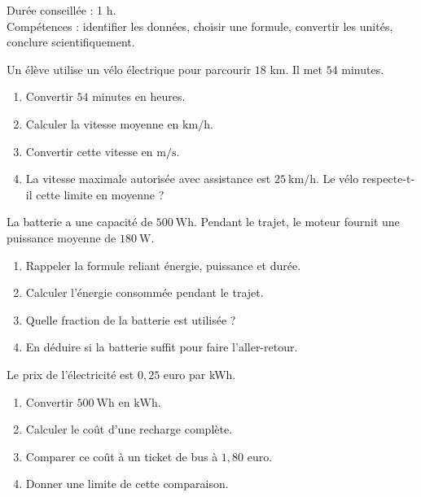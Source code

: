 \documentclass[11pt,a4paper]{article}
\newcounter{exercice}
\begin{document}
\begin{objectif}
Durée conseillée : 1 h.\\
Compétences : identifier les données, choisir une formule, convertir les unités, conclure scientifiquement.
\end{objectif}
\begin{exercice}
Un élève utilise un vélo électrique pour parcourir $18$ km. Il met $54$ minutes.
\begin{enumerate}
  \item Convertir $54$ minutes en heures.
  \item Calculer la vitesse moyenne en $\mathrm{km/h}$.
  \item Convertir cette vitesse en $\mathrm{m/s}$.
  \item La vitesse maximale autorisée avec assistance est $25\ \mathrm{km/h}$. Le vélo respecte-t-il cette limite en moyenne ?
\end{enumerate}
\end{exercice}

\begin{exercice}
La batterie a une capacité de $500\ \mathrm{Wh}$. Pendant le trajet, le moteur fournit une puissance moyenne de $180\ \mathrm{W}$.
\begin{enumerate}
  \item Rappeler la formule reliant énergie, puissance et durée.
  \item Calculer l'énergie consommée pendant le trajet.
  \item Quelle fraction de la batterie est utilisée ?
  \item En déduire si la batterie suffit pour faire l'aller-retour.
\end{enumerate}
\end{exercice}

\begin{exercice}
Le prix de l'électricité est $0{,}25$ euro par kWh.
\begin{enumerate}
  \item Convertir $500\ \mathrm{Wh}$ en $\mathrm{kWh}$.
  \item Calculer le coût d'une recharge complète.
  \item Comparer ce coût à un ticket de bus à $1{,}80$ euro.
  \item Donner une limite de cette comparaison.
\end{enumerate}
\end{exercice}
\newpage
\end{document}
